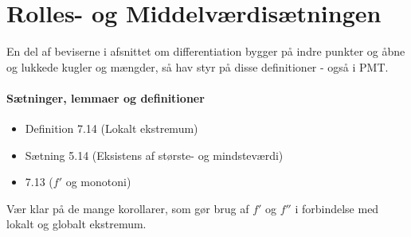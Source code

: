 \chapter{Rolles- og Middelværdisætningen}
En del af beviserne i afsnittet om differentiation bygger på indre punkter og åbne og lukkede kugler og mængder, så hav styr på disse definitioner - også i PMT.
\subsubsection{Sætninger, lemmaer og definitioner}
\begin{itemize}
\setlength\itemsep{0em}
\item Definition 7.14 (Lokalt ekstremum)
\item Sætning 5.14 (Eksistens af største- og mindsteværdi)
\item 7.13 ($f'$ og monotoni)
\end{itemize}
Vær klar på de mange korollarer, som gør brug af $f'$ og $f''$ i forbindelse med lokalt og globalt ekstremum.

